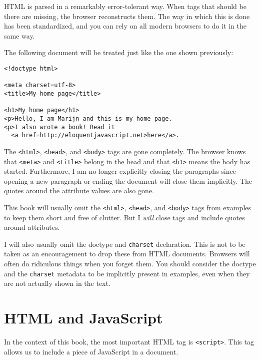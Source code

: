 HTML is parsed in a remarkably error-tolerant way. When tags that should be there are missing, the browser reconstructs them. The way in which this is done has been standardized, and you can rely on all modern browsers to do it in the same way.

The following document will be treated just like the one shown previously:

\begin{lstlisting}
<!doctype html>

<meta charset=utf-8>
<title>My home page</title>

<h1>My home page</h1>
<p>Hello, I am Marijn and this is my home page.
<p>I also wrote a book! Read it
  <a href=http://eloquentjavascript.net>here</a>.
\end{lstlisting}
\noindent{}

The \lstinline`<html>`, \lstinline`<head>`, and \lstinline`<body>` tags are gone completely. The browser knows that \lstinline`<meta>` and \lstinline`<title>` belong in the head and that \lstinline`<h1>` means the body has started. Furthermore, I am no longer explicitly closing the paragraphs since opening a new paragraph or ending the document will close them implicitly. The quotes around the attribute values are also gone.

This book will usually omit the \lstinline`<html>`, \lstinline`<head>`, and \lstinline`<body>` tags from examples to keep them short and free of clutter. But I \emph{will} close tags and include quotes around attributes.

I will also usually omit the doctype and \lstinline`charset` declaration. This is not to be taken as an encouragement to drop these from HTML documents. Browsers will often do ridiculous things when you forget them. You should consider the doctype and the \lstinline`charset` metadata to be implicitly present in examples, even when they are not actually shown in the text.

\label{browser.script_tag}\section{HTML and JavaScript}

In the context of this book, the most important HTML tag is \lstinline`<script>`. This tag allows us to include a piece of JavaScript in a document.

